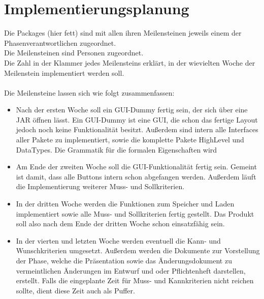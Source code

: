 \documentclass[a4paper]{scrreprt}
\begin{document}
\chapter{Implementierungsplanung}
Die Packages (hier fett) sind mit allen ihren Meilensteinen jeweils einem der Phasenverantwortlichen zugeordnet. \\
Die Meilensteinen sind Personen zugeordnet. \\
Die Zahl in der Klammer jedes Meilensteins erklärt, in der wievielten Woche der Meilenstein implementiert werden soll. \\\\

Die Meilensteine lassen sich wie folgt zusammenfassen: \\
\begin{itemize} 
\item Nach der ersten Woche soll ein GUI-Dummy fertig sein, der sich über eine JAR öffnen lässt. Ein GUI-Dummy ist eine GUI, die schon das fertige Layout jedoch noch keine Funktionalität besitzt. Außerdem sind intern alle Interfaces aller Pakete zu implementiert, sowie die komplette Pakete HighLevel und DataTypes. Die Grammatik für die formalen Eigenschaften wird 
\item Am Ende der zweiten Woche soll die GUI-Funktionalität fertig sein. Gemeint ist damit, dass alle Buttons intern schon abgefangen werden. Außerdem läuft die Implementierung weiterer Muss- und Sollkriterien. 
\item In der dritten Woche werden die Funktionen zum Speicher und Laden implementiert sowie alle Muss- und Sollkriterien fertig gestellt. Das Produkt soll also nach dem Ende der dritten Woche schon einsatzfähig sein.
\item In der vierten und letzten Woche werden eventuell die Kann- und Wunschkriterien umgesetzt. Außerdem werden die Dokumente zur Vorstellung der Phase, welche die Präsentation sowie das Änderungsdokument zu vermeintlichen Änderungen im Entwurf und oder Pflichtenheft darstellen, erstellt. Falls die eingeplante Zeit für Muss- und Kannkriterien nicht reichen sollte, dient diese Zeit auch als Puffer.


\end{itemize} 
\end{document}
